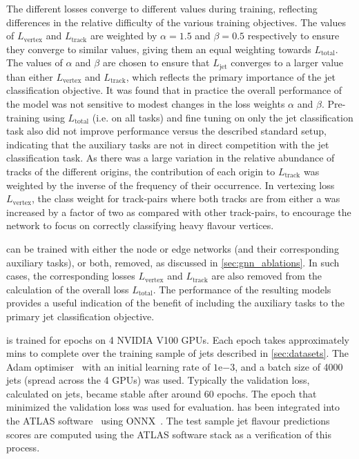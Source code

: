 The different losses converge to different values during training, reflecting differences in the relative difficulty of the various training objectives.
The values of $L_\text{vertex}$ and $L_\text{track}$ are weighted by $\alpha = 1.5$ and $\beta = 0.5$ respectively to ensure they converge to similar values, giving them an equal weighting towards $L_\text{total}$. 
The values of $\alpha$ and $\beta$ are chosen to ensure that $L_\text{jet}$ converges to a larger value than either $L_\text{vertex}$ and $L_\text{track}$, which reflects the primary importance of the jet classification objective.
It was found that in practice the overall performance of the model was not sensitive to modest changes in the loss weights $\alpha$ and $\beta$.
Pre-training using $L_\text{total}$ (i.e. on all tasks) and fine tuning on only the jet classification task also did not improve performance versus the described standard setup, indicating that the auxiliary tasks are not in direct competition with the jet classification task.
As there was a large variation in the relative abundance of tracks of the different origins, the contribution of each origin to $L_\text{track}$ was weighted by the inverse of the frequency of their occurrence.
In vertexing loss $L_\text{vertex}$, the class weight for track-pairs where both tracks are from either a \borchadron was increased by a factor of two as compared with other track-pairs, to encourage the network to focus on correctly classifying heavy flavour vertices.

\GNN can be trained with either the node or edge networks (and their corresponding auxiliary tasks), or both, removed, as discussed in \cref{sec:gnn_ablations}.
In such cases, the corresponding losses $L_\text{vertex}$ and $L_\text{track}$ are also removed from the calculation of the overall loss $L_\text{total}$. 
The performance of the resulting models provides a useful indication of the benefit of including the auxiliary tasks to the primary jet classification objective.

\GNN is trained for \nepochs epochs on 4 NVIDIA V100 GPUs.
Each epoch takes approximately \minsperepoch mins to complete over the training sample of \njetstrain jets described in \cref{sec:datasets}.
The Adam optimiser~\cite{arxiv.1412.6980} with an initial learning rate of $1\mathrm{e}{-3}$, and a batch size of 4000 jets (spread across the 4 GPUs) was used.
Typically the validation loss, calculated on \njetsval jets, became stable after around 60 epochs.
The epoch that minimized the validation loss was used for evaluation.
\GNN has been integrated into the ATLAS software~\cite{ATL-SOFT-PUB-2021-001} using ONNX~\cite{bai2019}.
The test sample jet flavour predictions scores are computed using the ATLAS software stack as a verification of this process.


